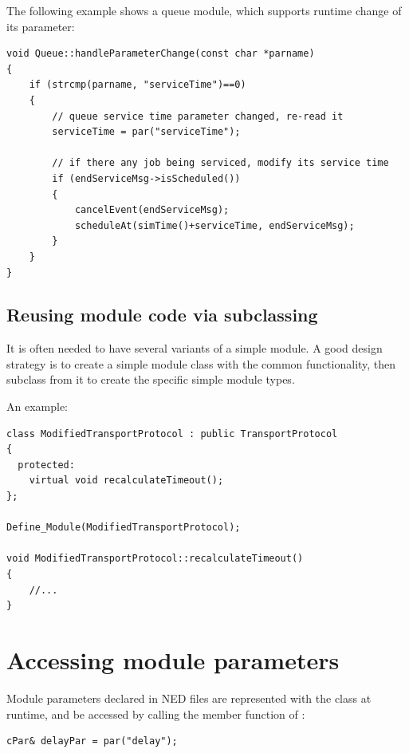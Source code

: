 The following example shows a queue module, which supports
runtime change of its  parameter:

\begin{verbatim}
void Queue::handleParameterChange(const char *parname)
{
    if (strcmp(parname, "serviceTime")==0)
    {
        // queue service time parameter changed, re-read it
        serviceTime = par("serviceTime");

        // if there any job being serviced, modify its service time
        if (endServiceMsg->isScheduled())
        {
            cancelEvent(endServiceMsg);
            scheduleAt(simTime()+serviceTime, endServiceMsg);
        }
    }
}
\end{verbatim}




\subsection{Reusing module code via subclassing}

It is often needed to have several variants of a simple module.
A good design strategy is to create a simple module class with
the common functionality, then subclass from it to create the
specific simple module types.


An example:

\begin{verbatim}
class ModifiedTransportProtocol : public TransportProtocol
{
  protected:
    virtual void recalculateTimeout();
};

Define_Module(ModifiedTransportProtocol);

void ModifiedTransportProtocol::recalculateTimeout()
{
    //...
}
\end{verbatim}




\section{Accessing module parameters}
\label{ch:simple-modules:parameters}

Module parameters declared in NED files are represented with the 
class at runtime, and be accessed
by calling the  member function of :

\begin{verbatim}
cPar& delayPar = par("delay");
\end{verbatim}

